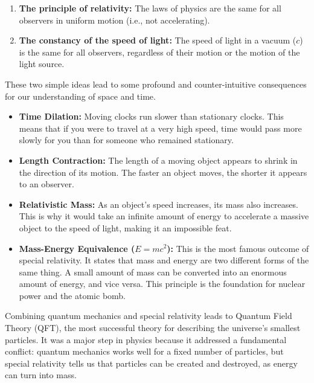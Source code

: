 \documentclass{article}
\begin{document}
\begin{enumerate}
    \item \textbf{The principle of relativity:} The laws of physics are the same for all observers in uniform motion (i.e., not accelerating).
    \item \textbf{The constancy of the speed of light:} The speed of light in a vacuum ($c$) is the same for all observers, regardless of their motion or the motion of the light source.
\end{enumerate}

These two simple ideas lead to some profound and counter-intuitive consequences for our understanding of space and time.

\begin{itemize}
    \item \textbf{Time Dilation:} Moving clocks run slower than stationary clocks. This means that if you were to travel at a very high speed, time would pass more slowly for you than for someone who remained stationary.
    \item \textbf{Length Contraction:} The length of a moving object appears to shrink in the direction of its motion. The faster an object moves, the shorter it appears to an observer.
    \item \textbf{Relativistic Mass:} As an object's speed increases, its mass also increases. This is why it would take an infinite amount of energy to accelerate a massive object to the speed of light, making it an impossible feat.
    \item \textbf{Mass-Energy Equivalence ($E=mc^2$):} This is the most famous outcome of special relativity. It states that mass and energy are two different forms of the same thing. A small amount of mass can be converted into an enormous amount of energy, and vice versa. This principle is the foundation for nuclear power and the atomic bomb.
\end{itemize}
Combining quantum mechanics and special relativity leads to Quantum Field Theory (QFT), the most successful theory for describing the universe's smallest particles. It was a major step in physics because it addressed a fundamental conflict: quantum mechanics works well for a fixed number of particles, but special relativity tells us that particles can be created and destroyed, as energy can turn into mass.
\end{document}
